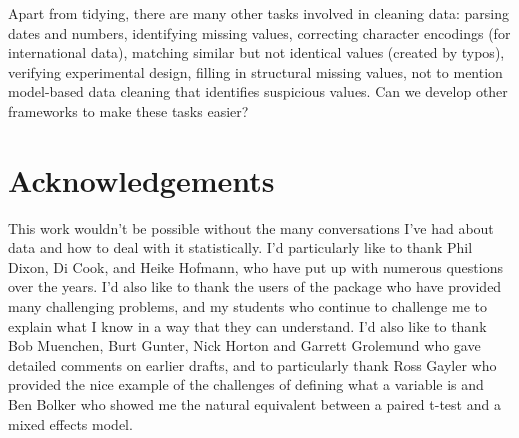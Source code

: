 \documentclass[article]{jss}
\begin{document}
Apart from tidying, there are many other tasks involved in cleaning data: parsing dates and numbers, identifying missing values, correcting character encodings (for international data), matching similar but not identical values (created by typos), verifying experimental design, filling in structural missing values, not to mention model-based data cleaning that identifies suspicious values. Can we develop other frameworks to make these tasks easier?


\section{Acknowledgements} 
\label{sec:acknowledgements}

This work wouldn't be possible without the many conversations I've had about data and how to deal with it statistically. I'd particularly like to thank Phil Dixon, Di Cook, and Heike Hofmann, who have put up with numerous questions over the years. I'd also like to thank the users of the  package who have provided many challenging problems, and my students who continue to challenge me to explain what I know in a way that they can understand. I'd also like to thank Bob Muenchen, Burt Gunter, Nick Horton and Garrett Grolemund who gave detailed comments on earlier drafts, and to particularly thank Ross Gayler who provided the nice example of the challenges of defining what a variable is and Ben Bolker who showed me the natural equivalent between a paired t-test and a mixed effects model.


\end{document}
